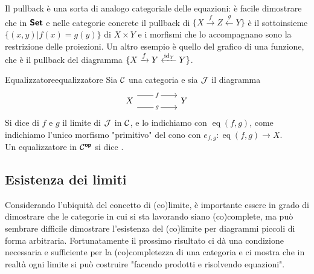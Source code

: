 \documentclass{article}
\renewcommand\C{\mc{C}}
\newcommand\J{\mc{J}}
\newcommand\eq{\operatorname{eq}}
\begin{document}
Il pullback è una sorta di analogo categoriale delle equazioni: è facile dimostrare che in $\text{\sffamily\textbf{Set}}$ e nelle categorie concrete il pullback di $\{ X\xrightarrow{f} Z \xleftarrow{g} Y \}$ è il sottoinsieme $\{ (x,y) | f(x) = g(y) \}$ di $X\times Y$ e i morfismi che lo accompagnano sono la restrizione delle proiezioni. Un altro esempio è quello del grafico di una funzione, che è il pullback del diagramma $\{ X\xrightarrow{f} Y \xleftarrow{\operatorname{id}_Y} Y \}$.

\begin{definition}{Equalizzatore}{equalizzatore}
    Sia $\C$ una categoria e sia $\J$ il diagramma 
    \[\begin{tikzcd}
    	X && Y
    	\arrow["f"{description}, shift left=3, from=1-1, to=1-3]
    	\arrow["g"{description}, shift right=3, from=1-1, to=1-3]
    \end{tikzcd}\]
    Si dice  di $f$ e $g$ il limite di $\J$ in $\C$, e lo indichiamo con $\eq(f,g)$,  come indichiamo l'unico morfismo "primitivo" del cono con $e_{f,g}:\eq(f,g)\to X$.\\
    Un equalizzatore in $\C^\op$ si dice .
\end{definition}


\subsection{Esistenza dei limiti}

Considerando l'ubiquità del concetto di (co)limite, è importante essere in grado di dimostrare che le categorie in cui si sta lavorando siano (co)complete, ma può sembrare difficile dimostrare l'esistenza del (co)limite per diagrammi piccoli di forma arbitraria. Fortunatamente il prossimo risultato ci dà una condizione necessaria e sufficiente per la (co)completezza di una categoria e ci mostra che in realtà ogni limite si può costruire "facendo prodotti e risolvendo equazioni".
\end{document}
